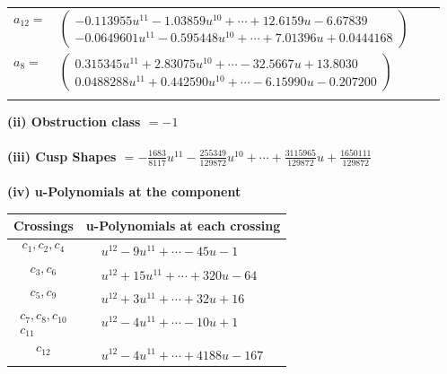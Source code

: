 \documentclass[1p]{elsarticle_modified}
\theoremstyle{definition}
\begin{document}
\begin{tabular}{m{7pt} m{180pt} m{7pt} m{180pt} }
\flushright $a_{12}=$&$\begin{pmatrix}-0.113955 u^{11}-1.03859 u^{10}+\cdots+12.6159 u-6.67839\\-0.0649601 u^{11}-0.595448 u^{10}+\cdots+7.01396 u+0.0444168\end{pmatrix}$ \\
\flushright $a_{8}=$&$\begin{pmatrix}0.315345 u^{11}+2.83075 u^{10}+\cdots-32.5667 u+13.8030\\0.0488288 u^{11}+0.442590 u^{10}+\cdots-6.15990 u-0.207200\end{pmatrix}$\\&\end{tabular}
\flushleft \textbf{(ii) Obstruction class $= -1$}\\~\\
\flushleft \textbf{(iii) Cusp Shapes $= -\frac{1683}{8117} u^{11}-\frac{255349}{129872} u^{10}+\cdots+\frac{3115965}{129872} u+\frac{1650111}{129872}$}\\~\\
\newpage\renewcommand{\arraystretch}{1}
\flushleft \textbf{(iv) u-Polynomials at the component}\newline \\
\begin{tabular}{m{50pt}|m{274pt}}
Crossings & \hspace{64pt}u-Polynomials at each crossing \\
\hline $$\begin{aligned}c_{1},c_{2},c_{4}\end{aligned}$$&$\begin{aligned}
&u^{12}-9 u^{11}+\cdots-45 u-1
\end{aligned}$\\
\hline $$\begin{aligned}c_{3},c_{6}\end{aligned}$$&$\begin{aligned}
&u^{12}+15 u^{11}+\cdots+320 u-64
\end{aligned}$\\
\hline $$\begin{aligned}c_{5},c_{9}\end{aligned}$$&$\begin{aligned}
&u^{12}+3 u^{11}+\cdots+32 u+16
\end{aligned}$\\
\hline $$\begin{aligned}c_{7},c_{8},c_{10}\\c_{11}\end{aligned}$$&$\begin{aligned}
&u^{12}-4 u^{11}+\cdots-10 u+1
\end{aligned}$\\
\hline $$\begin{aligned}c_{12}\end{aligned}$$&$\begin{aligned}
&u^{12}-4 u^{11}+\cdots+4188 u-167
\end{aligned}$\\
\hline
\end{tabular}\\~\\
\end{document}
